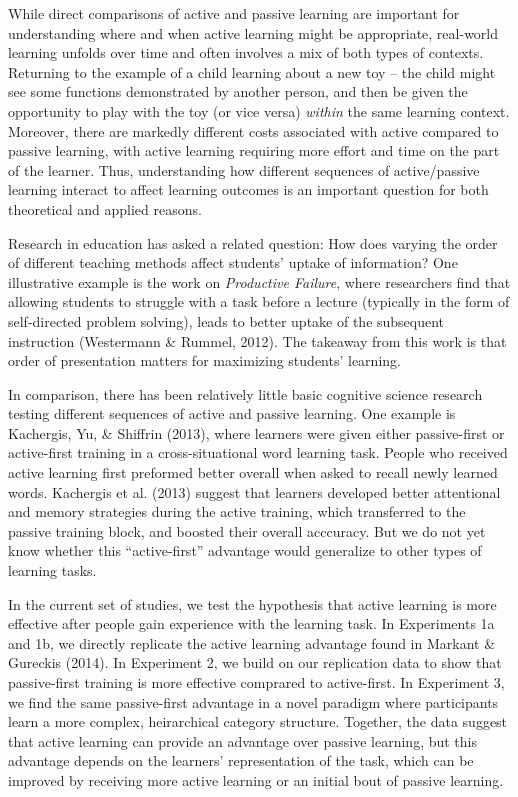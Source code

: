 \documentclass[10pt, letterpaper]{article}
\begin{document}
While direct comparisons of active and passive learning are important
for understanding where and when active learning might be appropriate,
real-world learning unfolds over time and often involves a mix of both
types of contexts. Returning to the example of a child learning about a
new toy -- the child might see some functions demonstrated by another
person, and then be given the opportunity to play with the toy (or vice
versa) \emph{within} the same learning context. Moreover, there are
markedly different costs associated with active compared to passive
learning, with active learning requiring more effort and time on the
part of the learner. Thus, understanding how different sequences of
active/passive learning interact to affect learning outcomes is an
important question for both theoretical and applied reasons.

Research in education has asked a related question: How does varying the
order of different teaching methods affect students' uptake of
information? One illustrative example is the work on \emph{Productive
Failure}, where researchers find that allowing students to struggle with
a task before a lecture (typically in the form of self-directed problem
solving), leads to better uptake of the subsequent instruction
(Westermann \& Rummel, 2012). The takeaway from this work is that order
of presentation matters for maximizing students' learning.

In comparison, there has been relatively little basic cognitive science
research testing different sequences of active and passive learning. One
example is Kachergis, Yu, \& Shiffrin (2013), where learners were given
either passive-first or active-first training in a cross-situational
word learning task. People who received active learning first preformed
better overall when asked to recall newly learned words. Kachergis et
al. (2013) suggest that learners developed better attentional and memory
strategies during the active training, which transferred to the passive
training block, and boosted their overall acccuracy. But we do not yet
know whether this ``active-first'' advantage would generalize to other
types of learning tasks.

In the current set of studies, we test the hypothesis that active
learning is more effective after people gain experience with the
learning task. In Experiments 1a and 1b, we directly replicate the
active learning advantage found in Markant \& Gureckis (2014). In
Experiment 2, we build on our replication data to show that
passive-first training is more effective comprared to active-first. In
Experiment 3, we find the same passive-first advantage in a novel
paradigm where participants learn a more complex, heirarchical category
structure. Together, the data suggest that active learning can provide
an advantage over passive learning, but this advantage depends on the
learners' representation of the task, which can be improved by receiving
more active learning or an initial bout of passive learning.
\end{document}
